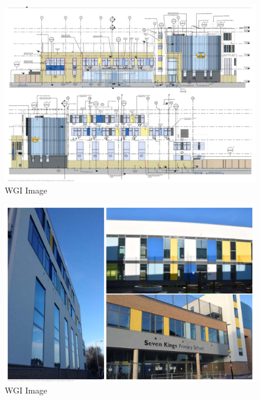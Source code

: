 \documentclass[
]{article}
\begin{document}
\begin{figure}[H]

{\centering \includegraphics{assets/WGI/WGI-b13.png}

}

\caption{WGI Image}

\end{figure}%
\begin{figure}[H]

{\centering \includegraphics{assets/WGI/WGI-b14.png}

}

\caption{WGI Image}

\end{figure}%
\end{document}
